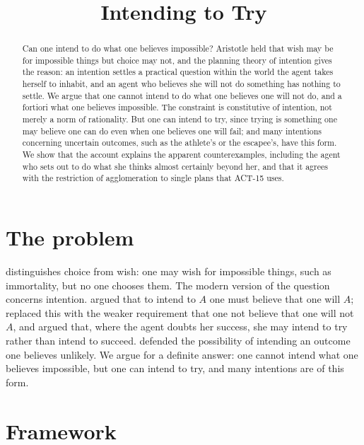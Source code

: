 \documentclass{situationist-preprint}
\title{Intending to Try}
\begin{document}
\maketitle

\begin{abstract}
Can one intend to do what one believes impossible? Aristotle held that wish may be for impossible things but choice may not, and the planning theory of intention gives the reason: an intention settles a practical question within the world the agent takes herself to inhabit, and an agent who believes she will not do something has nothing to settle. We argue that one cannot intend to do what one believes one will not do, and a fortiori what one believes impossible. The constraint is constitutive of intention, not merely a norm of rationality. But one can intend to try, since trying is something one may believe one can do even when one believes one will fail; and many intentions concerning uncertain outcomes, such as the athlete's or the escapee's, have this form. We show that the account explains the apparent counterexamples, including the agent who sets out to do what she thinks almost certainly beyond her, and that it agrees with the restriction of agglomeration to single plans that ACT-15 uses.
\end{abstract}

\section{The problem}

\citet[III.2, 1111b20--30]{AristotleNE} distinguishes choice from wish: one may wish for impossible things, such as immortality, but no one chooses them. The modern version of the question concerns intention. \citet{Grice1971} argued that to intend to $A$ one must believe that one will $A$; \citet{Bratman1987} replaced this with the weaker requirement that one not believe that one will not $A$, and argued that, where the agent doubts her success, she may intend to try rather than intend to succeed. \citet{McCann1986} defended the possibility of intending an outcome one believes unlikely. We argue for a definite answer: one cannot intend what one believes impossible, but one can intend to try, and many intentions are of this form.

\section{Framework}
\end{document}
